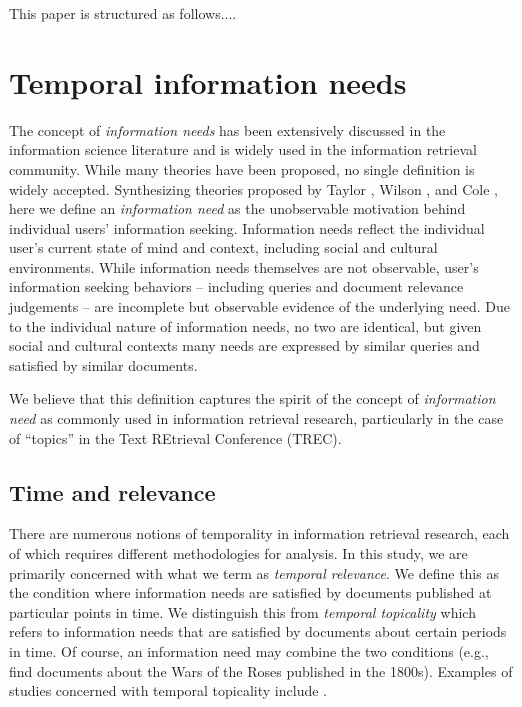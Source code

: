 \documentclass{sig-alternate}
\begin{document}
This paper is structured as follows....

\section{Temporal information needs}

The concept of \emph{information needs} has been extensively discussed in the information science literature and is widely used in the information retrieval community. While many theories have been proposed, no single definition is widely accepted.  Synthesizing theories proposed by Taylor \cite{Taylor}, Wilson \cite{Wilson}, and Cole \cite{Cole}, here we define an \emph{information need} as the unobservable motivation behind individual users' information seeking. Information needs reflect the individual user's current state of mind and context, including social and cultural environments. While information needs themselves are not observable, user's information seeking behaviors -- including queries and document relevance judgements -- are incomplete but observable evidence of the underlying need. Due to the individual nature of information needs, no two are identical, but given social and cultural contexts many needs are expressed by similar queries and satisfied by similar documents. 

We believe that this definition captures the spirit of the concept of \emph{information need} as commonly used in information retrieval research, particularly in the case of ``topics'' in the Text REtrieval Conference (TREC).

\subsection{Time and relevance}

There are numerous notions of temporality in information retrieval research, each of which requires different methodologies for analysis. In this study, we are primarily concerned with what we term as \emph{temporal relevance}. We define this as the condition where information needs are satisfied by documents published at particular points in time.  We distinguish this from \emph{temporal topicality} which refers to information needs that are satisfied by documents about certain periods in time.  Of course, an information need may combine the two conditions (e.g., find documents about the Wars of the Roses published in the 1800s). Examples of studies concerned with temporal topicality include \cite{Berberich2010, Kanhabua2011}.
\end{document}
